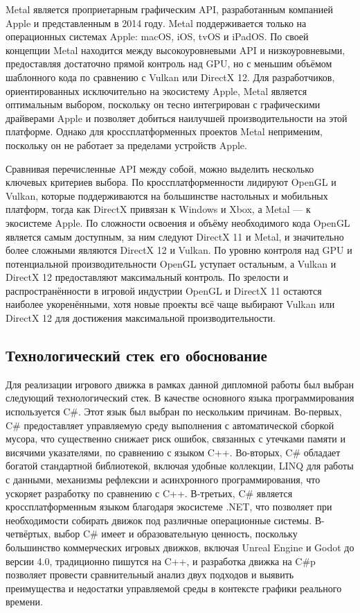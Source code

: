 Metal является проприетарным графическим API, разработанным компанией Apple и представленным в 2014 году. Metal поддерживается только на операционных системах Apple: macOS, iOS, tvOS и iPadOS. По своей концепции Metal находится между высокоуровневыми API и низкоуровневыми, предоставляя достаточно прямой контроль над GPU, но с меньшим объёмом шаблонного кода по сравнению с Vulkan или DirectX 12. Для разработчиков, ориентированных исключительно на экосистему Apple, Metal является оптимальным выбором, поскольку он тесно интегрирован с графическими драйверами Apple и позволяет добиться наилучшей производительности на этой платформе. Однако для кроссплатформенных проектов Metal неприменим, поскольку он не работает за пределами устройств Apple.

Сравнивая перечисленные API между собой, можно выделить несколько ключевых критериев выбора. По кроссплатформенности лидируют OpenGL и Vulkan, которые поддерживаются на большинстве настольных и мобильных платформ, тогда как DirectX привязан к Windows и Xbox, а Metal — к экосистеме Apple. По сложности освоения и объёму необходимого кода OpenGL является самым доступным, за ним следуют DirectX 11 и Metal, и значительно более сложными являются DirectX 12 и Vulkan. По уровню контроля над GPU и потенциальной производительности OpenGL уступает остальным, а Vulkan и DirectX 12 предоставляют максимальный контроль. По зрелости и распространённости в игровой индустрии OpenGL и DirectX 11 остаются наиболее укоренёнными, хотя новые проекты всё чаще выбирают Vulkan или DirectX 12 для достижения максимальной производительности.

\subsection{Технологический стек его обоснование}
Для реализации игрового движка в рамках данной дипломной работы был выбран следующий технологический стек. В качестве основного языка программирования используется C\#. Этот язык был выбран по нескольким причинам. Во-первых, C\# предоставляет управляемую среду выполнения с автоматической сборкой мусора, что существенно снижает риск ошибок, связанных с утечками памяти и висячими указателями, по сравнению с языком C++. Во-вторых, C\# обладает богатой стандартной библиотекой, включая удобные коллекции, LINQ для работы с данными, механизмы рефлексии и асинхронного программирования, что ускоряет разработку по сравнению с C++. В-третьих, C\# является кроссплатформенным языком благодаря экосистеме .NET, что позволяет при необходимости собирать движок под различные операционные системы. В-четвёртых, выбор C\# имеет и образовательную ценность, поскольку большинство коммерческих игровых движков, включая Unreal Engine и Godot до версии 4.0, традиционно пишутся на C++, и разработка движка на C\#p позволяет провести сравнительный анализ двух подходов и выявить преимущества и недостатки управляемой среды в контексте графики реального времени.

